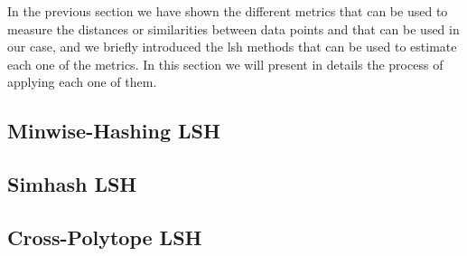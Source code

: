 In the previous section we have shown the different metrics that can be used to
measure the distances or similarities between data points and that can be used
in our case, and we briefly introduced the \acrshort{lsh} methods that can be
used to estimate each one of the metrics. In this section we will present in
details the process of applying each one of them.
\subsection{Minwise-Hashing LSH}
\label{subsect:minhash_lsh}


\subsection{Simhash LSH}
\label{subsect:simhash_lsh}


\subsection{Cross-Polytope LSH}
\label{subsect:crosspolytope_lsh}

